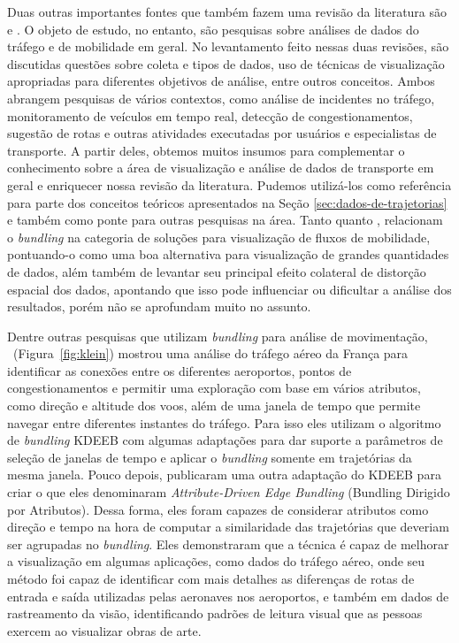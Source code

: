 Duas outras importantes fontes que também fazem uma revisão da literatura são
\citet{Chen2015} e \citet{Andrienko2017Visual}. O objeto de estudo, no entanto,
são pesquisas sobre análises de dados do tráfego e de mobilidade em geral. No
levantamento feito nessas duas revisões, são discutidas questões sobre coleta e
tipos de dados, uso de técnicas de visualização apropriadas para diferentes
objetivos de análise, entre outros conceitos. Ambos abrangem 
pesquisas de vários contextos, como análise de incidentes no tráfego,
monitoramento de veículos em tempo real, detecção de congestionamentos, sugestão
de rotas e outras atividades executadas por usuários e especialistas de
transporte. A partir deles, obtemos muitos insumos para
complementar o conhecimento sobre a área de visualização e análise de dados de
transporte em geral e enriquecer nossa revisão da literatura. Pudemos
utilizá-los como referência para parte dos conceitos teóricos apresentados na
Seção \ref{sec:dados-de-trajetorias} e também como ponte para outras pesquisas
na área. Tanto \citet{Chen2015} quanto \citet{Andrienko2017Visual}, relacionam o
\emph{bundling} na categoria de soluções para visualização de fluxos de
mobilidade, pontuando-o como uma boa alternativa para visualização de grandes
quantidades de dados, além também de levantar seu principal efeito colateral de
distorção espacial dos dados, apontando que isso pode influenciar ou dificultar
a análise dos resultados, porém não se aprofundam muito no assunto.

Dentre outras pesquisas que utilizam \emph{bundling} para análise de
movimentação, \citet{Klein2014}~(Figura~\ref{fig:klein}) mostrou uma análise do
tráfego aéreo da França para identificar as conexões entre os diferentes
aeroportos, pontos de congestionamentos e permitir uma exploração com base em
vários atributos, como direção e altitude dos voos, além de uma janela de tempo
que permite navegar entre diferentes instantes do tráfego. Para isso eles
utilizam o algoritmo de \emph{bundling} KDEEB com algumas adaptações para dar
suporte a parâmetros de seleção de janelas de tempo e aplicar o \emph{bundling}
somente em trajetórias da mesma janela. Pouco depois, \citet{adeb} publicaram
uma outra adaptação do KDEEB para criar o que eles denominaram
\emph{Attribute-Driven Edge Bundling} (Bundling Dirigido por Atributos). Dessa
forma, eles foram capazes de considerar atributos como direção e tempo na hora
de computar a similaridade das trajetórias que deveriam ser agrupadas no
\emph{bundling}. Eles demonstraram que a técnica é capaz de melhorar a
visualização em algumas aplicações, como dados do tráfego aéreo, onde seu método
foi capaz de identificar com mais detalhes as diferenças de rotas de entrada e
saída utilizadas pelas aeronaves nos aeroportos, e também em dados de
rastreamento da visão, identificando padrões de leitura visual que as pessoas
exercem ao visualizar obras de arte.

